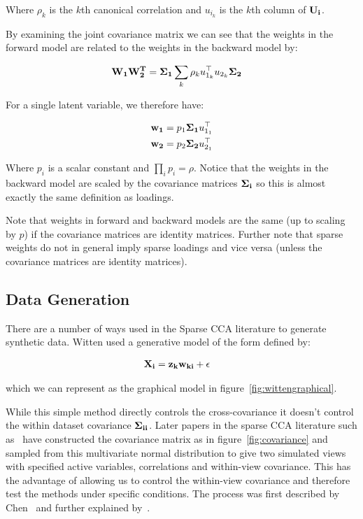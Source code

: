 Where $\rho_k$ is the $k$th canonical correlation and $u_{i_k}$ is the $k$th column of $\bold{U_i}$.

By examining the joint covariance matrix we can see that the weights in the forward model are related to the weights in the backward model by:

\begin{align}
    \bold{W_1W_2^T} &= \bold{\Sigma_1}\sum_k \rho_k u_{1_k}^\top u_{2_k} \bold{\Sigma_2}
\end{align}

For a single latent variable, we therefore have:

\begin{align}
    \bold{w_1} &= p_1\bold{\Sigma_1} u_{1_1}^\top \\
    \bold{w_2} &= p_2\bold{\Sigma_2} u_{2_1}^\top
\end{align}

Where $p_i$ is a scalar constant and $\prod_i p_i = \rho$. Notice that the weights in the backward model are scaled
by the covariance matrices $\bold{\Sigma_i}$ so this is almost exactly the same definition as loadings.

Note that weights in forward and backward models are the same (up to scaling by $p$) if the covariance matrices are identity matrices.
Further note that sparse weights do not in general imply sparse loadings and vice versa (unless the covariance matrices are identity matrices).

\subsection{Data Generation}\label{subsec:data-generation-background}

There are a number of ways used in the Sparse CCA literature to generate synthetic data.
Witten\cite{witten2009extensions} used a generative model of the form defined by:

\begin{align}\label{eq:wittengen}
    & \bold{X_i}=\bold{z_kw_{ki}}+\epsilon
\end{align}

which we can represent as the graphical model in figure~\ref{fig:wittengraphical}.

While this simple method directly controls the cross-covariance it doesn't control the within dataset covariance $\bold{\Sigma_{ii}}$.
Later papers in the sparse CCA literature such as~\cite{mai2019iterative,chen2013sparse} have constructed the covariance matrix as in figure~\ref{fig:covariance} and sampled from this multivariate normal distribution to give two simulated views with specified active variables, correlations and within-view covariance.
This has the advantage of allowing us to control the within-view covariance and therefore test the methods under specific conditions.
The process was first described by Chen~\cite{chen2013sparse} and further explained by~\cite{suo2017sparse}.


